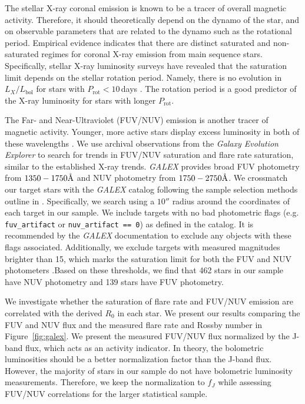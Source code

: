 \documentclass[twocolumn, linenumbers]{aastex631}
\newcommand{\angstrom}{\mbox{\normalfont\AA}}
\begin{document}
The stellar X-ray coronal emission is known to be a tracer of overall magnetic activity. Therefore,  it should theoretically depend on the dynamo of the star, and on observable parameters that
are related to the dynamo such as the rotational period. Empirical evidence indicates that there are distinct saturated and non-saturated regimes for coronal X-ray emission from main sequence
stars. Specifically, stellar X-ray luminosity surveys have revealed that the saturation limit depends on the stellar rotation period. Namely, there is no evolution in $L_X/L_\textrm{bol}$ for
stars with $P_\textrm{rot} < 10$\,days \citep{Pizzolato03}. The rotation period is a good predictor of the X-ray luminosity for stars with longer $P_\textrm{rot}$.

The Far- and Near-Ultraviolet (FUV/NUV) emission is another tracer of magnetic activity. Younger, more active stars display excess luminosity in both of these wavelengths \citep{Shkolnik2013}.
We use archival observations from the \textit{Galaxy Evolution Explorer} \citep[\textit{GALEX};][]{martin05} to search for trends in FUV/NUV saturation and flare rate saturation, similar to the
established X-ray trends. \textit{GALEX} provides broad FUV photometry from $1350-1750 \angstrom$ and NUV photometry from $1750-2750 \angstrom$. We crossmatch our target stars with the
\textit{GALEX} catalog following the sample selection methods outline in \citep{schneider18}. Specifically, we search using a $10''$ radius around the coordinates of each target in our sample.
We include targets with no bad photometric flags (e.g. \texttt{fuv\_artifact} or \texttt{nuv\_artifact == 0}) as defined
in the catalog. It is recommended by the \textit{GALEX} documentation to exclude any objects with these flags associated. Additionally, we exclude targets with measured magnitudes brighter than
15, which marks the saturation limit for both the FUV and NUV photometers \citep{morrissey07}.Based on these thresholds, we find that 462 stars in our sample have NUV photometry and 139 stars have
FUV photometry.

We investigate whether the saturation of flare rate and FUV/NUV emission are correlated with the derived $R_0$ in each star. We present our results comparing the FUV and NUV flux and the measured
flare rate and Rossby number in Figure~\ref{fig:galex}. We present the measured FUV/NUV flux normalized by the J-band flux, which acts as an activity indicator. In theory, the bolometric luminosities
should be a better normalization factor than the J-band flux. However, the majority of stars in our sample do not have bolometric luminosity  measurements. Therefore, we keep the normalization to
$f_J$ while assessing FUV/NUV correlations for the larger statistical sample.
\end{document}
